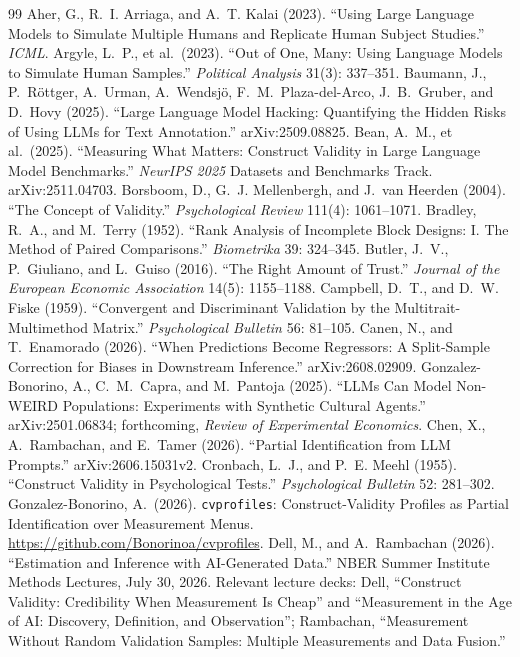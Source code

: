 \documentclass[10pt,letterpaper]{article}
\begin{document}
\begin{thebibliography}{99}\small
{} Aher, G., R.~I. Arriaga, and A.~T. Kalai (2023). ``Using Large Language Models to Simulate Multiple Humans and Replicate Human Subject Studies.'' \textit{ICML}.
 Argyle, L.~P., et al.\ (2023). ``Out of One, Many: Using Language Models to Simulate Human Samples.'' \textit{Political Analysis} 31(3): 337--351.
 Baumann, J., P.~R\"ottger, A.~Urman, A.~Wendsj\"o, F.~M.~Plaza-del-Arco, J.~B.~Gruber, and D.~Hovy (2025). ``Large Language Model Hacking: Quantifying the Hidden Risks of Using LLMs for Text Annotation.'' arXiv:2509.08825.
 Bean, A.~M., et al.\ (2025). ``Measuring What Matters: Construct Validity in Large Language Model Benchmarks.'' \textit{NeurIPS 2025} Datasets and Benchmarks Track. arXiv:2511.04703.
 Borsboom, D., G.~J. Mellenbergh, and J.\ van Heerden (2004). ``The Concept of Validity.'' \textit{Psychological Review} 111(4): 1061--1071.
 Bradley, R.~A., and M.~Terry (1952). ``Rank Analysis of Incomplete Block Designs: I. The Method of Paired Comparisons.'' \textit{Biometrika} 39: 324--345.
 Butler, J.~V., P.~Giuliano, and L.~Guiso (2016). ``The Right Amount of Trust.'' \textit{Journal of the European Economic Association} 14(5): 1155--1188.
 Campbell, D.~T., and D.~W. Fiske (1959). ``Convergent and Discriminant Validation by the Multitrait-Multimethod Matrix.'' \textit{Psychological Bulletin} 56: 81--105.
 Canen, N., and T.~Enamorado (2026). ``When Predictions Become Regressors: A Split-Sample Correction for Biases in Downstream Inference.'' arXiv:2608.02909.
 Gonzalez-Bonorino, A., C.~M.~Capra, and M.~Pantoja (2025). ``LLMs Can Model Non-WEIRD Populations: Experiments with Synthetic Cultural Agents.'' arXiv:2501.06834; forthcoming, \textit{Review of Experimental Economics}.
 Chen, X., A.~Rambachan, and E.~Tamer (2026). ``Partial Identification from LLM Prompts.'' arXiv:2606.15031v2.
 Cronbach, L.~J., and P.~E. Meehl (1955). ``Construct Validity in Psychological Tests.'' \textit{Psychological Bulletin} 52: 281--302.
 Gonzalez-Bonorino, A.\ (2026). \texttt{cvprofiles}: Construct-Validity Profiles as Partial Identification over Measurement Menus. \url{https://github.com/Bonorinoa/cvprofiles}.
 Dell, M., and A.~Rambachan (2026). ``Estimation and Inference with AI-Generated Data.'' NBER Summer Institute Methods Lectures, July 30, 2026. Relevant lecture decks: Dell, ``Construct Validity: Credibility When Measurement Is Cheap'' and ``Measurement in the Age of AI: Discovery, Definition, and Observation''; Rambachan, ``Measurement Without Random Validation Samples: Multiple Measurements and Data Fusion.''

\end{thebibliography}
\end{document}

